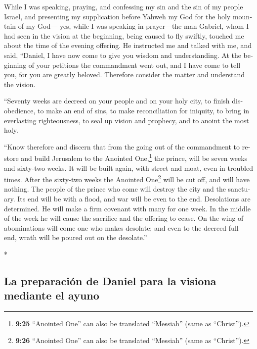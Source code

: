 \begin{paracol}{2}
\begin{otherlanguage}{english}
 While I was speaking, praying, and confessing my sin and
the sin of my people Israel, and presenting my supplication before
Yahweh my God for the holy mountain of my God---  yes,
while I was speaking in prayer---the man Gabriel, whom I had seen in the
vision at the beginning, being caused to fly swiftly, touched me about
the time of the evening offering.  He instructed me and
talked with me, and said, ``Daniel, I have now come to give you wisdom
and understanding.  At the beginning of your petitions
the commandment went out, and I have come to tell you, for you are
greatly beloved. Therefore consider the matter and understand the
vision.

 ``Seventy weeks are decreed on your people and on your
holy city, to finish disobedience, to make an end of sins, to make
reconciliation for iniquity, to bring in everlasting righteousness, to
seal up vision and prophecy, and to anoint the most holy.

 ``Know therefore and discern that from the going out of
the commandment to restore and build Jerusalem to the Anointed
One,\footnote{\textbf{9:25} ``Anointed One'' can also be translated
  ``Messiah'' (same as ``Christ'').} the prince, will be seven weeks and
sixty-two weeks. It will be built again, with street and moat, even in
troubled times.  After the sixty-two weeks the Anointed
One\footnote{\textbf{9:26} ``Anointed One'' can also be translated
  ``Messiah'' (same as ``Christ'').} will be cut off, and will have
nothing. The people of the prince who come will destroy the city and the
sanctuary. Its end will be with a flood, and war will be even to the
end. Desolations are determined.  He will make a firm
covenant with many for one week. In the middle of the week he will cause
the sacrifice and the offering to cease. On the wing of abominations
will come one who makes desolate; and even to the decreed full end,
wrath will be poured out on the desolate.''

\end{otherlanguage}

\switchcolumn[0]*

\hypertarget{la-preparaciuxf3n-de-daniel-para-la-visiona-mediante-el-ayuno}{%
\subsection{La preparación de Daniel para la visiona mediante el
ayuno}\label{la-preparaciuxf3n-de-daniel-para-la-visiona-mediante-el-ayuno}}


\end{paracol}
